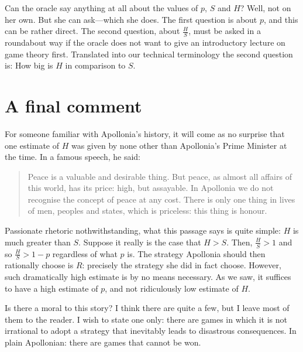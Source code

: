 \documentclass{amsart}
\begin{document}
\bigskip
Can the oracle say anything at all about the values of $p$, $S$ and $H$? Well,
not on her own. But she can ask---which she does. The first question is about
$p$, and this can be rather direct. The second question, about $\frac{H}{S}$, 
must be asked in a roundabout way if the oracle does not want to
give an introductory lecture on game theory first. 
Translated into our technical terminology the second question is: 
How big is $H$ in comparison to $S$.


\newpage
\section{A final comment}


For someone familiar with Apollonia's history,
it will come as no surprise that one estimate of $H$ was given by 
none other than Apollonia's Prime Minister at the time. In a famous speech, he
said: 
\begin{quote}
Peace is a valuable and desirable thing. But peace, as almost all affairs of
this world, has its price: high, but assayable. In Apollonia we do not recognise  
the concept of peace at any cost. There is only one thing in lives of
men, peoples and states, which is priceless: this thing is honour.
\end{quote}
Passionate rhetoric nothwithstanding, what this passage says is quite simple:
$H$ is much greater than $S$. Suppose it really is the case that $H>S$. Then, 
$\frac{H}{S} > 1$ and so $\frac{H}{S} > 1-p$ regardless of what $p$ is.
The strategy Apollonia should then rationally choose is $R$: precisely the
strategy she did in fact choose.  However, such dramatically high estimate is by
no means necessary. As we saw, it suffices to have a high estimate of $p$, and
not ridiculously low estimate of $H$.  


\bigskip
Is there a moral to this story? I think there are quite a few, but I leave most
of them to the reader. I wish to state one only: there are games in which it is
not irrational to adopt a strategy that inevitably leads to disastrous
consequences. In plain Apollonian: there are games that cannot be won.
\end{document}
